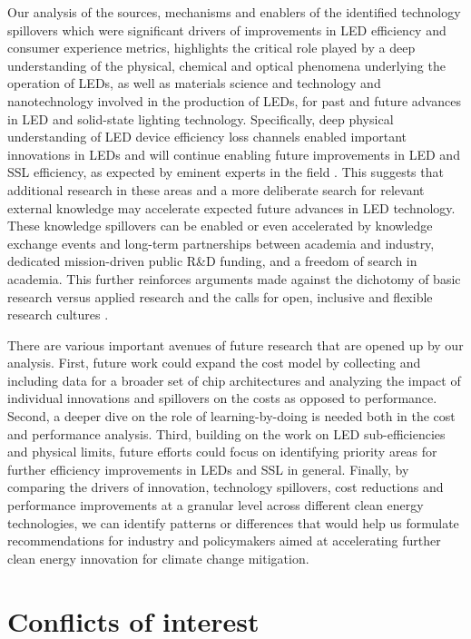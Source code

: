 \documentclass[twoside,twocolumn,9pt]{article}
\begin{document}
Our analysis of the sources, mechanisms and enablers of the identified technology spillovers which were significant drivers of improvements in LED efficiency and consumer experience metrics, highlights the critical role played by a  deep understanding of the physical, chemical and optical phenomena underlying the operation of LEDs, as well as materials science and technology and nanotechnology involved in the production of LEDs, for past and future advances in LED and solid-state lighting technology. Specifically, deep physical understanding of LED device efficiency loss channels enabled important innovations in LEDs and will continue enabling future improvements in LED and SSL efficiency, as expected by eminent experts in the field \cite{Weisbuch2020}. This suggests that additional research in these areas and a more deliberate search for relevant external knowledge may accelerate expected future advances in LED technology. These knowledge spillovers can be enabled or even accelerated by knowledge exchange events and long-term partnerships between academia and industry, dedicated mission-driven public R\&D funding, and a freedom of search in academia. This further reinforces arguments made against the dichotomy of basic research versus applied research \cite{narayanamurti2016cycles}\cite{narayanamurti2021genesis} and the calls for open, inclusive and flexible research cultures \cite{Stephan2021}.

There are various important avenues of future research that are opened up by our analysis. First, future work could expand the cost model by collecting and including data for a broader set of chip architectures and analyzing the impact of individual innovations and spillovers on the costs as opposed to performance. Second, a deeper dive on the role of learning-by-doing is needed both in the cost and performance analysis. Third, building on the work on LED sub-efficiencies and physical limits, future efforts could focus on identifying priority areas for further efficiency improvements in LEDs and SSL in general. Finally, by comparing the drivers of innovation, technology spillovers, cost reductions and performance improvements at a granular level across different clean energy technologies, we can identify patterns or differences that would help us formulate recommendations for industry and policymakers aimed at accelerating further clean energy innovation for climate change mitigation. 

\section*{Conflicts of interest}
\end{document}
